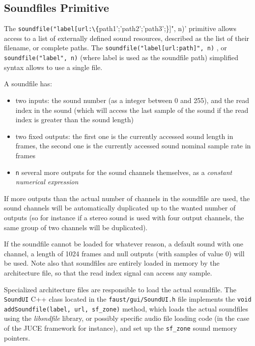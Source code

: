 \subsection{Soundfiles Primitive}

The  \lstinline'soundfile("label[url:\{'path1';'path2';'path3';\}]", n)' primitive allows access to a list of externally defined sound resources, described as the list of their filename, or complete paths. The \lstinline'soundfile("label[url:path]", n)' , or \lstinline'soundfile("label", n)' (where label is used as the soundfile path) simplified syntax allows to use a single file. 

A soundfile has:

\begin{itemize} 
\item two inputs: the sound number (as a integer between 0 and 255), and the read index in the sound (which will access the last sample of the sound if the read index is greater than the sound length)
\item two fixed outputs: the first one is the currently accessed sound length in frames, the second one is the currently accessed sound nominal sample rate in frames
\item  \lstinline'n' several more outputs for the sound channels themselves, as a \textit{constant numerical expression}
\end{itemize}

If more outputs than the actual number of channels in the soundfile are used, the sound channels will be automatically duplicated up to the wanted number of outputs (so for instance if a stereo sound is used with four output channels, the same group of two channels will be duplicated).

If the soundfile cannot be loaded for whatever reason, a default sound with one channel, a length of 1024 frames and null outputs (with samples of value 0) will be used. Note also that soundfiles are entirely loaded in memory by the architecture file, so that the read index signal can access any sample.

Specialized architecture files are responsible to load the actual soundfile. The \lstinline'SoundUI' C++ class located in the \lstinline'faust/gui/SoundUI.h' file implements the \lstinline'void addSoundfile(label, url, sf_zone)' method, which loads the actual soundfiles using the {\it libsndfile} library, or possibly specific audio file loading code (in the case of the JUCE framework for instance), and set up the \lstinline'sf_zone' sound memory pointers. 


